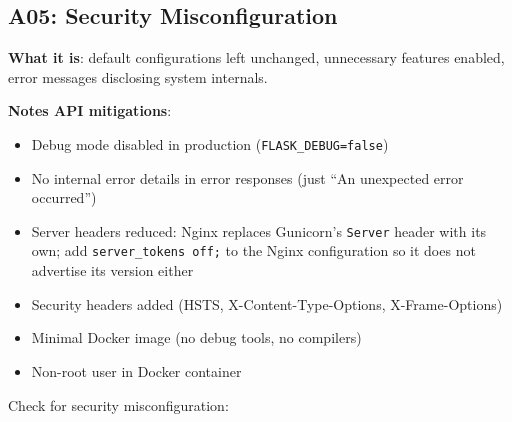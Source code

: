 \subsection*{A05: Security Misconfiguration}\label{38-security:a05-security-misconfiguration}

\textbf{What it is}: default configurations left unchanged, unnecessary features enabled, error messages disclosing system internals.

\textbf{Notes API mitigations}:

\begin{itemize}
\tightlist
\item
  Debug mode disabled in production (\texttt{FLASK\_DEBUG=false})
\item
  No internal error details in error responses (just ``An unexpected error occurred'')
\item
  Server headers reduced: Nginx replaces Gunicorn's \texttt{Server} header with its own; add \texttt{server\_tokens\ off;} to the Nginx configuration so it does not advertise its version either
\item
  Security headers added (HSTS, X-Content-Type-Options, X-Frame-Options)
\item
  Minimal Docker image (no debug tools, no compilers)
\item
  Non-root user in Docker container
\end{itemize}

\noindent{}Check for security misconfiguration:


